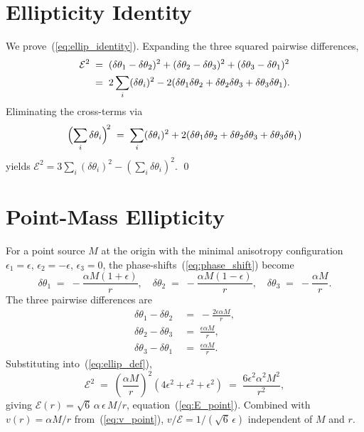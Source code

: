 \documentclass[pdflatex,sn-mathphys-num]{sn-jnl}%
\theoremstyle{thmstyleone}%
\theoremstyle{thmstyletwo}%
\theoremstyle{thmstylethree}%
\begin{document}
\begin{appendices}
\section{Ellipticity Identity}
\label{app:ellipticity}

We prove~(\ref{eq:ellip_identity}). Expanding the three squared
pairwise differences,
\begin{align}
    \mathcal{E}^2
    &\;=\;
    (\delta\theta_1-\delta\theta_2)^2
    +(\delta\theta_2-\delta\theta_3)^2
    +(\delta\theta_3-\delta\theta_1)^2
    \notag\\
    &\;=\;
    2\sum_{i}(\delta\theta_i)^2
    -2(\delta\theta_1\delta\theta_2
    +\delta\theta_2\delta\theta_3
    +\delta\theta_3\delta\theta_1).
\end{align}
Eliminating the cross-terms via
\begin{equation}
    \Bigl(\sum_i\delta\theta_i\Bigr)^{\!2}
    \;=\;
    \sum_i(\delta\theta_i)^2
    +2(\delta\theta_1\delta\theta_2
    +\delta\theta_2\delta\theta_3
    +\delta\theta_3\delta\theta_1)
\end{equation}
yields
$\mathcal{E}^2=3\sum_i(\delta\theta_i)^2
-(\sum_i\delta\theta_i)^2$. \qed

\section{Point-Mass Ellipticity}
\label{app:point_ellip}

For a point source $M$ at the origin with the minimal
anisotropy configuration $\epsilon_1=\epsilon$,
$\epsilon_2=-\epsilon$, $\epsilon_3=0$, the
phase-shifts~(\ref{eq:phase_shift}) become
\begin{equation}
    \delta\theta_1\;=\;-\frac{\alpha M(1+\epsilon)}{r},
    \quad
    \delta\theta_2\;=\;-\frac{\alpha M(1-\epsilon)}{r},
    \quad
    \delta\theta_3\;=\;-\frac{\alpha M}{r}.
\end{equation}
The three pairwise differences are
\begin{equation}
\begin{split}
    \delta\theta_1-\delta\theta_2
    &\;=\;-\frac{2\epsilon\alpha M}{r}, \\
    \delta\theta_2-\delta\theta_3
    &\;=\;\frac{\epsilon\alpha M}{r}, \\
    \delta\theta_3-\delta\theta_1
    &\;=\;\frac{\epsilon\alpha M}{r}.
\end{split}
\end{equation}
Substituting into~(\ref{eq:ellip_def}),
\begin{equation}
    \mathcal{E}^2
    \;=\;
    \left(\frac{\alpha M}{r}\right)^{\!2}
    (4\epsilon^2+\epsilon^2+\epsilon^2)
    \;=\;
    \frac{6\epsilon^2\alpha^2 M^2}{r^2},
\end{equation}
giving $\mathcal{E}(r)=\sqrt{6}\,\alpha\,\epsilon\,M/r$,
equation~(\ref{eq:E_point}). Combined with
$v(r)=\alpha M/r$ from~(\ref{eq:v_point}),
$v/\mathcal{E}=1/(\sqrt{6}\,\epsilon)$ independent of $M$ and
$r$.


\end{appendices}
\end{document}
